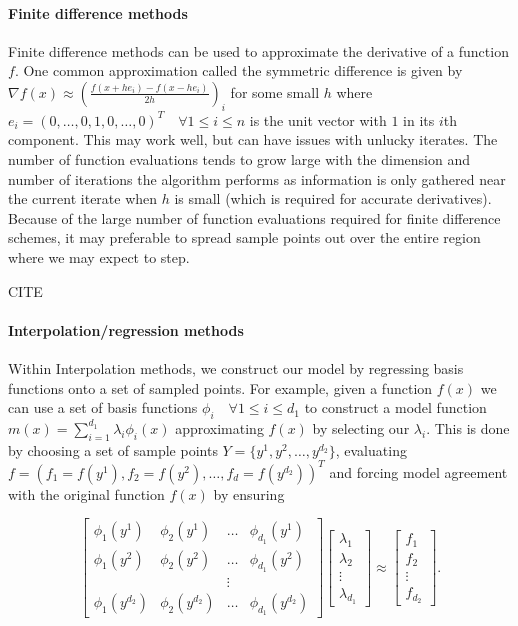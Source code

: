 \documentclass{article}
\begin{document}
\paragraph{Finite difference methods}

Finite difference methods can be used to approximate the derivative of a function $f$.
One common approximation called the symmetric difference is given by $\nabla f(x) \approx (\frac{f(x+he_i) - f(x-he_i)}{2h})_i$ for some small $h$ where $e_i = (0,\ldots, 0, 1, 0, \ldots, 0)^T \quad \forall 1 \le i \le n$ is the unit vector with $1$ in its $i$th component.
This may work well, but can have issues with unlucky iterates.
The number of function evaluations tends to grow large with the dimension and number of iterations the algorithm performs as information is only gathered near the current iterate when $h$ is small (which is required for accurate derivatives).
Because of the large number of function evaluations required for finite difference schemes, it may preferable to spread sample points out over the entire region where we may expect to step.

CITE

\paragraph{Interpolation/regression methods}

Within Interpolation methods, we construct our model by regressing basis functions onto a set of sampled points.
For example, given a function $f(x)$ we can use a set of basis functions $\phi_i \quad \forall 1 \le i \le d_1$ to construct a model function $m(x) = \sum_{i=1}^{d_1} \lambda_i \phi_i(x)$ approximating $f(x)$ by selecting our $\lambda_i$.
This is done by choosing a set of sample points
$Y = \{y^1, y^2, \ldots, y^{d_2}\}$,
evaluating $f = (f_1 = f(y^1), f_2 = f(y^2), \ldots, f_d = f(y^{d_2}))^T$ and forcing model agreement with the original function $f(x)$ by ensuring

\[
\begin{bmatrix}
    \phi_1(y^1)      & \phi_2(y^1)       & \ldots & \phi_{d_1}(y^1)      \\
    \phi_1(y^2)      & \phi_2(y^2)       & \dots  & \phi_{d_1}(y^2)      \\
                     &                   & \vdots &                      \\
    \phi_1(y^{d_2})  & \phi_2(y^{d_2})   & \ldots & \phi_{d_1}(y^{d_2})
\end{bmatrix}
\begin{bmatrix}
    \lambda_1      \\
    \lambda_2      \\
    \vdots         \\            
    \lambda_{d_1}
\end{bmatrix}
\approx
\begin{bmatrix}
    f_1      \\
    f_2      \\
    \vdots         \\            
    f_{d_2}
\end{bmatrix}.
\]
\end{document}

